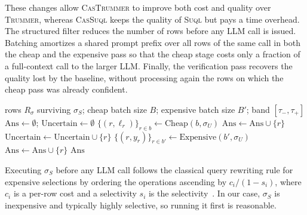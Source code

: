 \documentclass[sigconf]{acmart}
\begin{document}
These changes allow \textsc{CasTrummer} to improve both cost and quality over \textsc{Trummer}, whereas \textsc{CasSuql} keeps the quality of \textsc{Suql} but pays a time overhead. The structured filter reduces the number of rows before any LLM call is issued. Batching  amortizes a shared prompt prefix over all rows of the same call in both the cheap and the expensive pass so that the cheap stage costs only a fraction of a full-context call to the larger LLM. Finally, the verification pass recovers the quality lost by the baseline, without processing again the rows on which the cheap pass was already confident.

\begin{algorithm}[h]
\caption{\textsc{CasTrummer} (batch-level cascade)}
\label{alg:trummer-v1}
\begin{algorithmic}[1]
\Require rows $R_\sigma$ surviving $\sigma_S$; cheap batch size $B$; expensive batch size $B'$; band $[\tau_-,\tau_+]$
\State $\mathrm{Ans} \gets \emptyset$; $\mathrm{Uncertain} \gets \emptyset$
 
  \State $\{(r, \ell_r)\}_{r \in b} \gets \mathrm{Cheap}(b, \sigma_U)$ 
      \State $\mathrm{Ans} \gets \mathrm{Ans} \cup \{r\}$
      \State $\mathrm{Uncertain} \gets \mathrm{Uncertain} \cup \{r\}$ 
    \EndIf
  \EndFor
\EndFor
{} 
  \State $\{(r, y_r)\}_{r \in b'} \gets \mathrm{Expensive}(b', \sigma_U)$
    $\mathrm{Ans} \gets \mathrm{Ans} \cup \{r\}$ \EndIf \EndFor
\EndFor
\State \Return $\mathrm{Ans}$
\end{algorithmic}
\end{algorithm}

Executing $\sigma_S$ before any LLM call follows the classical query rewriting rule for expensive selections by ordering the operations ascending by $c_i/(1-s_i)$, where $c_i$ is a per-row cost and a selectivity $s_i$ is the selectivity~\cite{hellerstein1993predicate}. In our case, $\sigma_S$ is inexpensive and typically highly selective, so running it first is reasonable.
\end{document}
